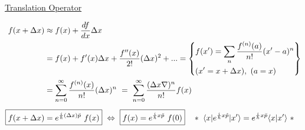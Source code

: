 \documentclass[12pt]{article}
\begin{document}
\newpage \noindent
\underline{Translation Operator}

\vspace{-10pt}
\begin{align*}
    f(x + \Delta x) &\approx f(x) + \frac{df}{dx} \Delta x \\
    &= f(x) + f'(x) \Delta x + \frac{f''(x)}{2!} (\Delta x)^2 + ... 
        = \left\{ \begin{aligned}
            &f(x') = \sum_{n} \frac{ f^{(n)}(a) }{n!} (x'-a)^n \\
            &(x' = x + \Delta x), \ (a = x)
        \end{aligned} \right\} 
        \\
    &= \sum_{n=0}^\infty \frac{ f^{(n)}(x) }{n!} (\Delta x)^n 
        \ = \ \sum_{n=0}^\infty \frac{ (\Delta x \nabla)^n }{n!} f(x) 
        \\[5pt]
    \Aboxed{ f(x + \Delta x) &= e^{\frac{i}{\hbar} (\Delta x) \breve{p}} \ f(x) }
        \ \Leftrightarrow \ \boxed{ f(x) = e^{\frac{i}{\hbar} x \breve{p}} \ f(0) }
        \hspace{10pt} *\ \langle x | e^{\frac{i}{\hbar} x \hat{p}} | x' \rangle 
        =  e^{\frac{i}{\hbar} x \breve{p}} \langle x | x' \rangle \ *
\end{align*}    
\end{document}
